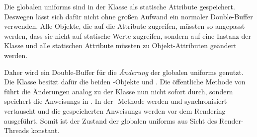 Die globalen \glspl{uniform} sind in der Klasse  als statische Attribute gespeichert. Deswegen lässt sich dafür nicht ohne großen Aufwand ein normaler Double-Buffer verwenden. Alle Objekte, die auf die Attribute zugreifen, müssten so angepasst werden, dass sie nicht auf statische Werte zugreifen, sondern auf eine Instanz der Klasse und alle statischen Attribute müssten zu Objekt-Attributen geändert werden.

Daher wird ein Double-Buffer für die \emph{Änderung} der globalen \glspl{uniform} genutzt. Die Klasse  besitzt dafür die beiden -Objekte  und . Die öffentliche Methode  von  führt die Änderungen analog zu der Klasse  nun nicht sofort durch, sondern speichert die \glspl{Anweisung} in . In der -Methode werden  und  synchronisiert vertauscht und die gespeicherten \glspl{Anweisung} werden vor dem Rendering ausgeführt. Somit ist der Zustand der globalen \glspl{uniform} aus Sicht des Render-Threads konstant.

